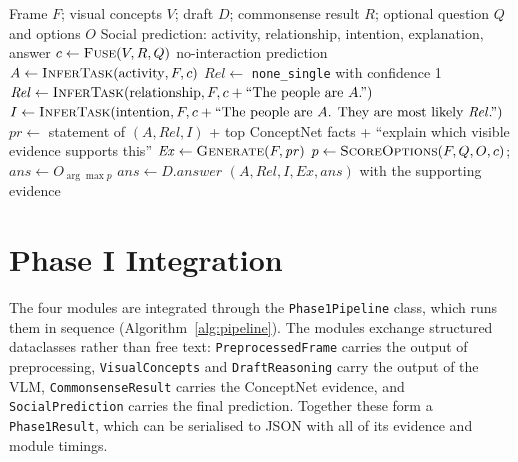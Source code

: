 \documentclass[12pt,a4paper,oneside]{report}
\newcommand{\code}[1]{\texttt{#1}}
\begin{document}
\begin{algorithm}[htbp]
\caption{Social interaction reasoning}
\label{alg:reason}
\begin{algorithmic}[1]
\Require Frame $F$; visual concepts $V$; draft $D$; commonsense result $R$; optional question $Q$ and options $O$
\Ensure Social prediction: activity, relationship, intention, explanation, answer
\State $c \gets \textsc{Fuse}(V, R, Q)$ 
  \State \Return no-interaction prediction
\EndIf
\State $A \gets \textsc{InferTask}(\text{activity}, F, c)$ 
  \State $\mathit{Rel} \gets$ \code{none\_single} with confidence 1
\Else
  \State $\mathit{Rel} \gets \textsc{InferTask}(\text{relationship}, F, c + \text{``The people are } A\text{.''})$
\EndIf
\State $I \gets \textsc{InferTask}(\text{intention}, F, c + \text{``The people are } A\text{. They are most likely } \mathit{Rel}\text{.''})$
\State $\mathit{pr} \gets$ statement of $(A, \mathit{Rel}, I)$ + top ConceptNet facts + ``explain which visible evidence supports this''
\State $\mathit{Ex} \gets \textsc{Generate}(F, \mathit{pr})$
  \State $p \gets \textsc{ScoreOptions}(F, Q, O, c)$;\; $\mathit{ans} \gets O_{\arg\max p}$
  \State $\mathit{ans} \gets D.\mathit{answer}$
\EndIf
\State \Return $(A, \mathit{Rel}, I, \mathit{Ex}, \mathit{ans})$ with the supporting evidence
\end{algorithmic}
\end{algorithm}

\section{Phase I Integration}

The four modules are integrated through the \code{Phase1Pipeline} class, which
runs them in sequence (Algorithm~\ref{alg:pipeline}). The modules exchange
structured dataclasses rather than free text: \code{PreprocessedFrame} carries
the output of preprocessing, \code{VisualConcepts} and \code{DraftReasoning}
carry the output of the VLM, \code{CommonsenseResult} carries the ConceptNet
evidence, and \code{SocialPrediction} carries the final prediction. Together
these form a \code{Phase1Result}, which can be serialised to JSON with all of
its evidence and module timings.
\end{document}
